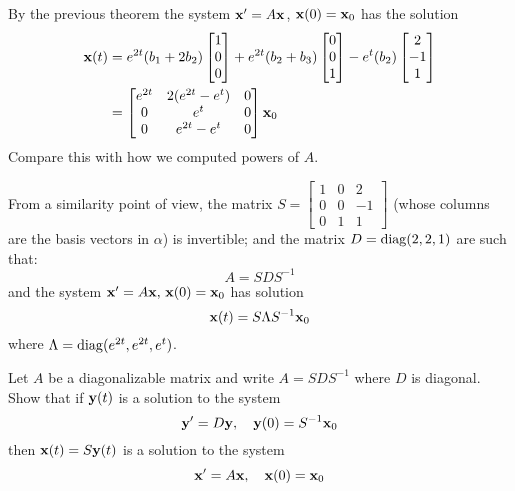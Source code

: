 \documentclass[10pt]{article}
\begin{document}
\begin{example}
    By the previous theorem the system $\mathbf{x}'=A\mathbf{x}$, $\mathbf{x}(0)=\mathbf{x}_0$ has the solution
    \begin{align*}
        \mathbf{x}(t) &= e^{2t}(b_1+2b_2)\begin{bmatrix}
            1\\0\\0
        \end{bmatrix} + e^{2t}(b_2+b_3)\begin{bmatrix}
            0\\0\\1
        \end{bmatrix} - e^t(b_2)\begin{bmatrix}
            2\\-1\\1
        \end{bmatrix} \\ 
        &= \begin{bmatrix}
            e^{2t} & 2(e^{2t}-e^t) & 0 \\ 
            0 & e^t & 0 \\ 
            0 & e^{2t}-e^t & 0
        \end{bmatrix}\mathbf{x}_0
    \end{align*}
    Compare this with how we computed powers of $A$.
    \vspace{2mm}

    From a similarity point of view, the matrix $S = \begin{bmatrix}
        1 & 0 & 2 \\ 0 & 0 & -1 \\ 0 & 1 & 1
    \end{bmatrix}$ (whose columns are the basis vectors in $\alpha$) is invertible; and the matrix $D=\operatorname{diag}(2,2,1)$ are such that:
    \begin{equation*}
        A = SDS^{-1}
    \end{equation*}
    and the system $\mathbf{x}'=A\mathbf{x},\, \mathbf{x}(0)=\mathbf{x}_0$ has solution
    \begin{equation*}
        \mathbf{x}(t) = S\Lambda S^{-1}\mathbf{x}_0
    \end{equation*}
    where $\Lambda = \operatorname{diag}(e^{2t}, e^{2t}, e^t)$.
\end{example}
\newpage

\begin{exercise}
    Let $A$ be a diagonalizable matrix and write $A=SDS^{-1}$ where $D$ is diagonal. Show that if $\mathbf{y}(t)$ is a solution to the system
    \begin{equation*}
        \mathbf{y}'=D\mathbf{y},\quad \mathbf{y}(0) = S^{-1}\mathbf{x}_0
    \end{equation*}
    then $\mathbf{x}(t) = S\mathbf{y}(t)$ is a solution to the system 
    \begin{equation*}
        \mathbf{x}'=A\mathbf{x},\quad \mathbf{x}(0)=\mathbf{x}_0
    \end{equation*}
\end{exercise}
\newpage
\end{document}
